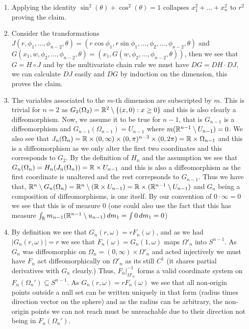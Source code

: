 \documentclass[12pt,a4paper]{article}
\begin{document}
\begin{solution}
\begin{enumerate}[label=(\alph*)]
	\item Applying the identity $\sin^2(\theta)+\cos^2(\theta)=1$ collapses $x_1^2+\ldots+x_n^2$ to $r^2$ proving the claim.
	\item Consider the transformations  $J(r,\phi_1,\ldots,\phi_{n-2},\theta)=(r\cos\phi_1,r\sin\phi_1,\ldots,\phi_2,\ldots,\phi_{n-2},\theta)$ and $G(x_1,w,\phi_2,\ldots,\phi_{n-2},\theta)=(x_1,G(w,\phi_2,\ldots,\phi_{n-2},\theta))$, then we see that $G=H\circ J$ and by the multivariate chain rule we must have $DG=DH\cdot DJ$, we can calculate $DJ$ easily and $DG$ by induction on the dimension, this proves the claim.
	\item The variables associated to the $m$-th dimension are subscripted by $m$. 
		This is trivial for $n=2$ as $G_2(\Omega_2)=\mathbb{R}^2\setminus\{(x,0):x\geq 0\}$ and this is also clearly a diffeomorphism. 
		Now, we assume it to be true for $n-1$, that is $G_{n-1}$ is a diffeomorphism and $G_{n-1}(\Omega_{n-1})=U_{n-1}$ where $m(\mathbb{R}^{n-1}\setminus U_{n-1})=0$. 
		We also see that $J_n(\Omega_n)=\mathbb{R}\times(0,\infty)\times(0,\pi)^{n-3}\times(0,2\pi)=\mathbb{R}\times\Omega_{n-1}$ and this is a diffeomorphism as we only alter the first two coordinates and this corresponds to $G_2$. 
		By the definition of $H_n$ and the assumption we see that $G_n(\Omega_n)=H_n(J_n(\Omega_n))=\mathbb{R}\times U_{n-1}$ and this is also a diffeomorphism as the first coordinate is unaltered and the rest correpsonds to $G_{n-1}.$  
		Thus we have that, $\mathbb{R}^n\setminus G_n(\Omega_n)=\mathbb{R}^n\setminus(\mathbb{R}\times U_{n-1})=\mathbb{R}\times(\mathbb{R}^{n-1}\setminus U_{n-1})$ and $G_n$ being a composition of diffeomorphisms, is one itself. 
		By our convention of $0\cdot\infty=0$ we see that this is of measure $0$ (one could also use the fact that this has measure $\int_{\mathbb{R}} m_{n-1}(\mathbb{R}^{n-1}\setminus u_{n-1})\,dm_1=\int 0\,dm_1=0$)
	\item By definition we see that $G_n(r,\omega)=rF_n(\omega)$, and as we had $|G_n(r,\omega)|=r$ we see that $F_n(\omega)=G_n(1,\omega)$ maps $\Omega'_n$ into $S^{n-1}$. 
		As $G_n$ was diffeomorphic on $\Omega_n=(0,\infty)\times\Omega'_n$ and acted injectively we must have $F_n$ act diffeomorphically on $\Omega'_n$ as its still $C^1$ (it shares partial derivatives with $G_n$ clearly.) 
		Thus, $F_n|_{\Omega'_n}^{-1}$ forms a valid coordinate system on $F_n(\Omega_n')\subseteq S^{n-1}$. 
		As $G_n(r,\omega)=rF_n(\omega)$ we see that all non-origin points outside a null set can be written uniquely in that form (radius times direction vector on the sphere) and as the radius can be arbitrary, the non-origin points we can not reach must be unreachable due to their direction not being in $F_n(\Omega_n')$. 

\end{enumerate}
\end{solution}
\end{document}
